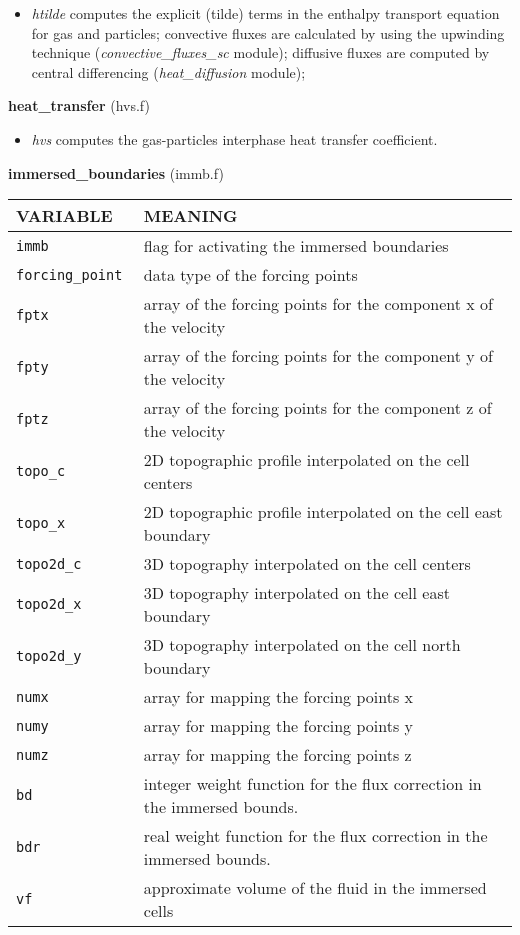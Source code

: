 \begin{itemize}
\item{\em htilde} computes the explicit (tilde) terms in the enthalpy transport equation for gas and particles; 
convective fluxes are calculated by using the upwinding technique ({\em convective\_fluxes\_sc} module); 
diffusive fluxes are computed by central differencing ({\em heat\_diffusion} module);
\end{itemize}
%
%
{\large{\bf heat\_transfer}} (hvs.f) \\
\begin{itemize}
\item{\em hvs} computes the gas-particles interphase heat transfer coefficient.
\end{itemize}
%
%
{\large{\bf immersed\_boundaries}} (immb.f) \\[5mm]
\begin{tabular}{|p{6cm}|p{6cm}|}\hline
VARIABLE & MEANING\\\hline
\tt immb & flag for activating the immersed boundaries \\ \hline
\tt forcing\_point & data type of the forcing points \\ \hline
\tt fptx & array of the forcing points for the component x of the velocity  \\ \hline
\tt fpty & array of the forcing points for the component y of the velocity  \\ \hline
\tt fptz & array of the forcing points for the component z of the velocity  \\ \hline
\tt topo\_c & 2D topographic profile interpolated on the cell centers  \\ \hline
\tt topo\_x & 2D topographic profile interpolated on the cell east boundary  \\ \hline
\tt topo2d\_c & 3D topography interpolated on the cell centers  \\ \hline
\tt topo2d\_x & 3D topography interpolated on the cell east boundary  \\ \hline
\tt topo2d\_y & 3D topography interpolated on the cell north boundary  \\ \hline
\tt numx & array for mapping the forcing points x  \\ \hline
\tt numy & array for mapping the forcing points y  \\ \hline
\tt numz & array for mapping the forcing points z  \\ \hline
\tt bd & integer weight function for the flux correction in the immersed bounds.  \\ \hline
\tt bdr & real weight function for the flux correction in the immersed bounds. \\ \hline
\tt vf & approximate volume of the fluid in the immersed cells \\ \hline
\end{tabular}
